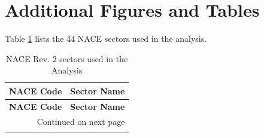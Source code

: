 \section{Additional Figures and Tables}\label{app:C}
Table \ref{tab:nace_sectors} lists the 44 NACE sectors used in the analysis.

\begin{longtable}{ll}
\caption{NACE Rev. 2 sectors used in the Analysis}
\label{tab:nace_sectors} \\
\toprule
\textbf{NACE Code} & \textbf{Sector Name} \\
\midrule
\endfirsthead

\toprule
\textbf{NACE Code} & \textbf{Sector Name} \\
\midrule
\endhead

\midrule
\multicolumn{2}{r}{{Continued on next page}} \\
\midrule
\endfoot

\bottomrule
\endlastfoot


\end{longtable}
